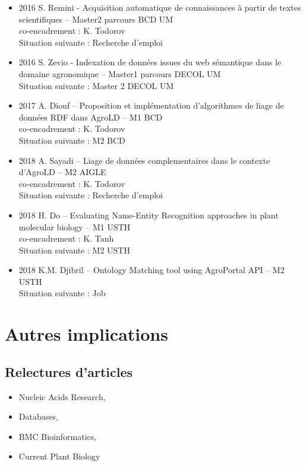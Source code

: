 \begin{itemize}
\item 2016 S. Remini - Acquisition automatique de connaissances à partir de textes scientifiques – Master2 parcours BCD UM \\
co-encadrement : K. Todorov \\ 
Situation suivante : Recherche d’emploi

\item  2016 S. Zevio - Indexation de données issues du web sémantique dans le domaine agronomique – Master1 parcours DECOL UM \\
Situation suivante : Master 2 DECOL UM 

\item  2017 A. Diouf –  Proposition et implémentation d’algorithmes de liage de données RDF dans AgroLD – M1 BCD \\
co-encadrement : K. Todorov \\
Situation suivante : M2 BCD

\item  2018 A. Sayadi –  Liage de données complementaires dans le contexte d'AgroLD – M2 AIGLE \\
co-encadrement : K. Todorov \\
Situation suivante : Recherche d'emploi

\item  2018 H. Do –  Evaluating Name-Entity Recognition approaches in plant molecular biology – M1 USTH \\
co-encadrement : K. Tanh \\
Situation suivante : M2 USTH

\item  2018 K.M. Djibril –  Ontology Matching tool using AgroPortal API – M2 USTH \\
Situation suivante : Job
\end{itemize}


\section{Autres implications}
\subsection*{Relectures d’articles}
\begin{itemize}
\item Nucleic Acids Research, 
\item Databases, 
\item BMC Bioinformatics, 
\item Current Plant Biology
\end{itemize}

